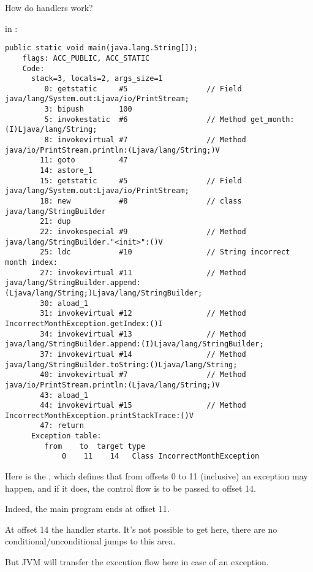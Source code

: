 How do handlers work?

\main in :

\begin{lstlisting}[caption=Month2.class]
  public static void main(java.lang.String[]);
    flags: ACC_PUBLIC, ACC_STATIC
    Code:
      stack=3, locals=2, args_size=1
         0: getstatic     #5                  // Field java/lang/System.out:Ljava/io/PrintStream;
         3: bipush        100
         5: invokestatic  #6                  // Method get_month:(I)Ljava/lang/String;
         8: invokevirtual #7                  // Method java/io/PrintStream.println:(Ljava/lang/String;)V
        11: goto          47
        14: astore_1      
        15: getstatic     #5                  // Field java/lang/System.out:Ljava/io/PrintStream;
        18: new           #8                  // class java/lang/StringBuilder
        21: dup           
        22: invokespecial #9                  // Method java/lang/StringBuilder."<init>":()V
        25: ldc           #10                 // String incorrect month index: 
        27: invokevirtual #11                 // Method java/lang/StringBuilder.append:(Ljava/lang/String;)Ljava/lang/StringBuilder;
        30: aload_1       
        31: invokevirtual #12                 // Method IncorrectMonthException.getIndex:()I
        34: invokevirtual #13                 // Method java/lang/StringBuilder.append:(I)Ljava/lang/StringBuilder;
        37: invokevirtual #14                 // Method java/lang/StringBuilder.toString:()Ljava/lang/String;
        40: invokevirtual #7                  // Method java/io/PrintStream.println:(Ljava/lang/String;)V
        43: aload_1       
        44: invokevirtual #15                 // Method IncorrectMonthException.printStackTrace:()V
        47: return        
      Exception table:
         from    to  target type
             0    11    14   Class IncorrectMonthException
\end{lstlisting}

Here is the , which defines that from offsets 0 to 11 (inclusive) an exception 
 may happen, and if it does, the control flow is to be passed to offset 14.

Indeed, the main program ends at offset 11.

At offset 14 the handler starts. It's not possible to get here, 
there are no conditional/unconditional jumps to this area.

But \ac{JVM} will transfer the execution flow here in case of an exception.

